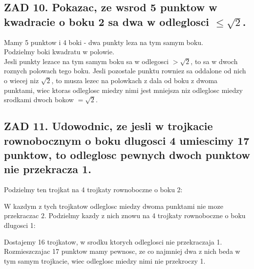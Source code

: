 \documentclass{article}
\begin{document}
\subsection*{\color{tit}ZAD 10. Pokazac, ze wsrod 5 punktow w kwadracie o boku 2 sa dwa w odleglosci $\leq\sqrt{2}$.}
  Mamy 5 punktow i 4 boki - dwa punkty leza na tym samym boku.\smallskip\\
  Podzielmy boki kwadratu w polowie. \smallskip\\
  Jesli punkty lezace na tym samym boku sa w odlegosci $>\sqrt{2}$, to sa w dwoch roznych polowach tego boku. Jesli pozostale punktu rowniez sa oddalone od nich o wiecej niz $\sqrt{2}$, to musza lezec na polowkach z dala od boku z dwoma punktami, wiec ktoras odleglosc miedzy nimi jest mniejsza niz odleglosc miedzy srodkami dwoch bokow $=\sqrt{2}$.
\subsection*{\color{tit}ZAD 11. Udowodnic, ze jesli w trojkacie rownobocznym o boku dlugosci 4 umiescimy 17 punktow, to odleglosc pewnych dwoch punktow nie przekracza 1.}
  Podzielmy ten trojkat na 4 trojkaty rownoboczne o boku 2:
  \begin{center}
  \end{center}
  W kazdym z tych trojkatow odleglosc miedzy dwoma punktami nie moze przekraczac $2$. Podzielmy kazdy z nich znowu na 4 trojkaty rownoboczne o boku dlugosci 1:
  \begin{center}
  \end{center}
  Dostajemy 16 trojkatow, w srodku ktorych odleglosci nie przekraczaja 1. Rozmieszczajac 17 punktow mamy pewnosc, ze co najmniej dwa z nich beda w tym samym trojkacie, wiec odleglosc miedzy nimi nie przekroczy 1.
\end{document}
